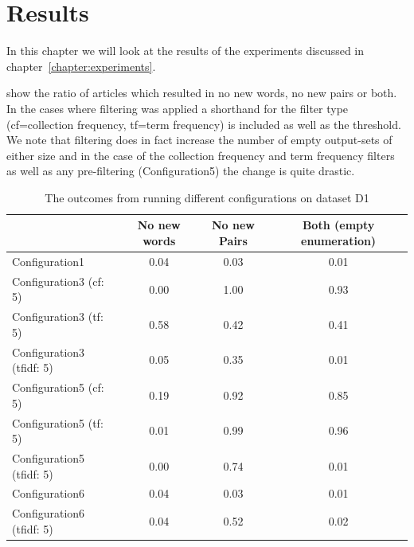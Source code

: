 \chapter{Results}
\label{chapter:results}
In this chapter we will look at the results of the experiments discussed in chapter~\ref{chapter:experiments}.

 show the ratio of articles which resulted in no new words, no new pairs or both. In the cases where filtering was applied a shorthand for the filter type (cf=collection frequency, tf=term frequency) is included as well as the threshold. We note that filtering does in fact increase the number of empty output-sets of either size and in the case of the collection frequency and term frequency filters as well as any pre-filtering (Configuration5) the change is quite drastic.

\begin{center}
\begin{table}
  \begin{tabular}{|l|c|c|c|}
    \hline
    &  No new words & No new Pairs & Both (empty enumeration) \\ \hline
    Configuration1                    & 0.04  & 0.03  & 0.01 \\ \hline
    Configuration3 (cf: 5)            & 0.00  & 1.00  & 0.93 \\ \hline
    Configuration3 (tf: 5)            & 0.58  & 0.42  & 0.41 \\ \hline
    Configuration3 (tfidf: 5)         & 0.05  & 0.35  & 0.01 \\ \hline
    Configuration5 (cf: 5)            & 0.19  & 0.92  & 0.85 \\ \hline
    Configuration5 (tf: 5)            & 0.01  & 0.99  & 0.96 \\ \hline
    Configuration5 (tfidf: 5)         & 0.00  & 0.74  & 0.01 \\ \hline
    Configuration6                    & 0.04  & 0.03  & 0.01 \\ \hline
    Configuration6 (tfidf: 5)         & 0.04  & 0.52  & 0.02 \\ \hline
  \end{tabular}
  \caption{The outcomes from running different configurations on dataset D1}
  \label{tab:d1}
\end{table}
\end{center}

